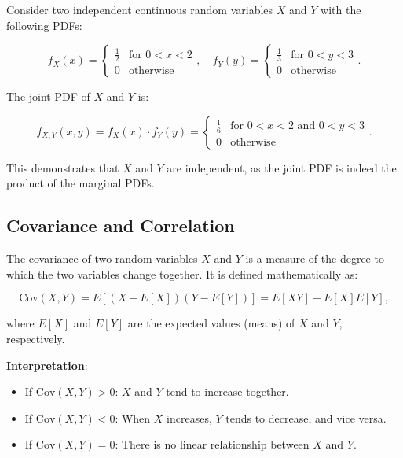 \begin{example}
    Consider two independent continuous random variables \( X \) and \( Y \) with the following PDFs:

\[
f_X(x) = \begin{cases} 
\frac{1}{2} & \text{for } 0 < x < 2 \\
0 & \text{otherwise}
\end{cases}, \quad
f_Y(y) = \begin{cases} 
\frac{1}{3} & \text{for } 0 < y < 3 \\
0 & \text{otherwise}
\end{cases}.
\]

The joint PDF of \( X \) and \( Y \) is:

\[
f_{X,Y}(x,y) = f_X(x) \cdot f_Y(y) = \begin{cases} 
\frac{1}{6} & \text{for } 0 < x < 2 \text{ and } 0 < y < 3 \\
0 & \text{otherwise}
\end{cases}.
\]

This demonstrates that \( X \) and \( Y \) are independent, as the joint PDF is indeed the product of the marginal PDFs.
\end{example}

\subsection{Covariance and Correlation}

\begin{definition}
    The covariance of two random variables \(X\) and \(Y\) is a measure of the degree to which the two variables change together. It is defined mathematically as:

\[
\text{Cov}(X, Y) = E\left[(X - E[X])(Y - E[Y])\right] = E[XY] - E[X]E[Y],
\]

where \(E[X]\) and \(E[Y]\) are the expected values (means) of \(X\) and \(Y\), respectively.
\end{definition}

\textbf{Interpretation}:

\begin{itemize}
    \item If \(\text{Cov}(X, Y) > 0\): \(X\) and \(Y\) tend to increase together.
    \item If \(\text{Cov}(X, Y) < 0\): When \(X\) increases, \(Y\) tends to decrease, and vice versa.
    \item If \(\text{Cov}(X, Y) = 0\): There is no linear relationship between \(X\) and \(Y\).
\end{itemize}

